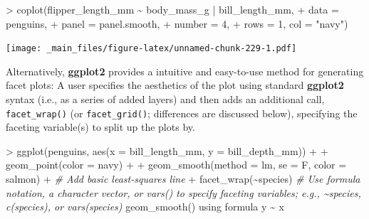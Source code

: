 \documentclass[
]{book}
\newenvironment{Shaded}{\begin{snugshade}}{\end{snugshade}}
\newcommand{\AttributeTok}[1]{\textcolor[rgb]{0.77,0.63,0.00}{#1}}
\newcommand{\CommentTok}[1]{\textcolor[rgb]{0.56,0.35,0.01}{\textit{#1}}}
\newcommand{\DecValTok}[1]{\textcolor[rgb]{0.00,0.00,0.81}{#1}}
\newcommand{\FunctionTok}[1]{\textcolor[rgb]{0.00,0.00,0.00}{#1}}
\newcommand{\NormalTok}[1]{#1}
\newcommand{\SpecialCharTok}[1]{\textcolor[rgb]{0.00,0.00,0.00}{#1}}
\newcommand{\StringTok}[1]{\textcolor[rgb]{0.31,0.60,0.02}{#1}}
\begin{document}
\begin{Shaded}
\begin{Highlighting}[]
\SpecialCharTok{\textgreater{}} \FunctionTok{coplot}\NormalTok{(flipper\_length\_mm }\SpecialCharTok{\textasciitilde{}}\NormalTok{ body\_mass\_g }\SpecialCharTok{|}\NormalTok{ bill\_length\_mm, }
\SpecialCharTok{+}        \AttributeTok{data =}\NormalTok{ penguins,}
\SpecialCharTok{+}        \AttributeTok{panel =}\NormalTok{ panel.smooth,}
\SpecialCharTok{+}        \AttributeTok{number =} \DecValTok{4}\NormalTok{, }
\SpecialCharTok{+}        \AttributeTok{rows =} \DecValTok{1}\NormalTok{, }\AttributeTok{col =} \StringTok{"navy"}\NormalTok{)}
\end{Highlighting}
\end{Shaded}

\texttt{[image: \_main\_files/figure-latex/unnamed-chunk-229-1.pdf]}

Alternatively, \textbf{ggplot2} provides a intuitive and easy-to-use method for generating facet plots: A user specifies the aesthetics of the plot using standard \textbf{ggplot2} syntax (i.e., as a series of added layers) and then adds an additional call, \texttt{facet\_wrap()} (or \texttt{facet\_grid()}; differences are discussed below), specifying the faceting variable(s) to split up the plots by.

\begin{Shaded}
\begin{Highlighting}[]
\SpecialCharTok{\textgreater{}} \FunctionTok{ggplot}\NormalTok{(penguins, }\FunctionTok{aes}\NormalTok{(}\AttributeTok{x =}\NormalTok{ bill\_length\_mm, }\AttributeTok{y =}\NormalTok{ bill\_depth\_mm)) }\SpecialCharTok{+}
\SpecialCharTok{+}   \FunctionTok{geom\_point}\NormalTok{(}\AttributeTok{color =} \StringTok{\textquotesingle{}navy\textquotesingle{}}\NormalTok{) }\SpecialCharTok{+}
\SpecialCharTok{+}   \FunctionTok{geom\_smooth}\NormalTok{(}\AttributeTok{method =} \StringTok{\textquotesingle{}lm\textquotesingle{}}\NormalTok{, }\AttributeTok{se =}\NormalTok{ F, }\AttributeTok{color =} \StringTok{\textquotesingle{}salmon\textquotesingle{}}\NormalTok{) }\SpecialCharTok{+} \CommentTok{\# Add basic least{-}squares line}
\SpecialCharTok{+}   \FunctionTok{facet\_wrap}\NormalTok{(}\SpecialCharTok{\textasciitilde{}}\NormalTok{species) }\CommentTok{\# Use formula notation, a character vector, or vars() to specify faceting variables; e.g., \textasciitilde{}species, c(\textquotesingle{}species\textquotesingle{}), or vars(species)}
\StringTok{\textasciigrave{}}\AttributeTok{geom\_smooth()}\StringTok{\textasciigrave{}}\NormalTok{ using formula }\StringTok{\textquotesingle{}y \textasciitilde{} x\textquotesingle{}}
\end{Highlighting}
\end{Shaded}
\end{document}
